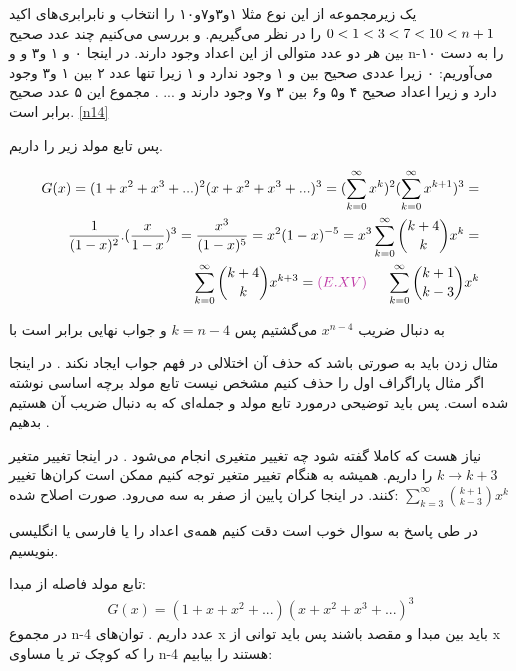 \documentclass[11pt,largemargins]{h2wp}
\begin{document}
\solution
یک زیرمجموعه از این نوع مثلا {۱و۳و۷و۱۰} را انتخاب و نابرابری‌های اکید 
    $ \\ 0 < 1 < 3 < 7 < 10 < n+1 \\ $ 
   را در نظر می‌گیریم. و بررسی می‌کنیم چند عدد صحیح بین هر دو عدد متوالی از این اعداد وجود دارند. در اینجا ۰ و ۱ و۳ و
    و n-۱۰ 
   را به دست می‌آوریم: ۰ زیرا عددی صحیح بین
   و ۱ وجود ندارد و ۱ زیرا تنها عدد ۲ بین ۱ و۳ وجود دارد و
   زیرا اعداد صحیح ۴ و۵ و۶ بین ۳ و۷ وجود دارند و ... .
   مجموع این ۵ عدد صحیح برابر
     است.
     \ref{n14}
     
    پس تابع مولد زیر را داریم.
    
   \begin{align*}
   G(x) = ( 1 + x^2 + x^3 + ...)^2 (x + x^2 + x^3 + ...)^3 = ( \sum_{k = 0}^{\infty} x^k)^2 ( \sum_{k = 0}^{\infty} x^{k+1})^3 =\\ \frac{1}{(1-x)^2} . (\frac{x}{1-x})^3 = \frac{x^3 }{(1-x)^5} = x^2 (1-x)^{-5} = x^3 \sum_{k=0}^{\infty} \binom{k+4}{k} x ^ k =\\ \sum_{k=0}^{\infty} \binom{k+4}{k} x^{k+3} = {\textcolor{byzantine}{(E.XV)}} \hspace{0.5 cm} \sum_{k=0}^{\infty}\binom{k+1}{k-3} x^k
\end{align*}    
      
      به دنبال ضریب
      $ x ^ {n-4 } $
      می‌گشتیم پس 
      $ k = n-4 $
      و جواب نهایی برابر است با
      
  
 
      
\notes

  مثال زدن باید به صورتی باشد که حذف آن اختلالی در فهم جواب ایجاد نکند . در اینجا اگر مثال پاراگراف اول را حذف کنیم مشخص نیست تابع مولد برچه اساسی نوشته شده است. پس باید توضیحی درمورد تابع مولد و جمله‌ای که به دنبال ضریب آن هستیم بدهیم .
		
     نیاز هست که کاملا گفته شود چه تغییر متغیری انجام می‌شود . در اینجا تغییر متغیر $ k \rightarrow {k+3} $   را داریم.  همیشه به هنگام تغییر متغیر توجه کنیم ممکن است کران‌ها تغییر کنند. در اینجا کران پایین از صفر به سه می‌رود. 
	 صورت اصلاح شده:
	 $ \sum_{k=3}^{\infty}\binom{k+1}{k-3} x^k $
	
	  در طی پاسخ به سوال خوب است دقت کنیم همه‌ی اعداد را یا فارسی یا انگلیسی 
	  بنویسیم.
	  
	  
\solution
  تابع مولد فاصله از مبدا:
   \begin{align*}
   G(x)=(1+x+x^2+...)(x+x^2+x^3+...)^3
   \end{align*}
   در مجموع n-4 عدد داریم . توان‌های x باید بین مبدا و مقصد باشند پس باید توانی از x را که کوچک تر یا مساوی n-4 هستند را بیابیم:
   
\end{document}
